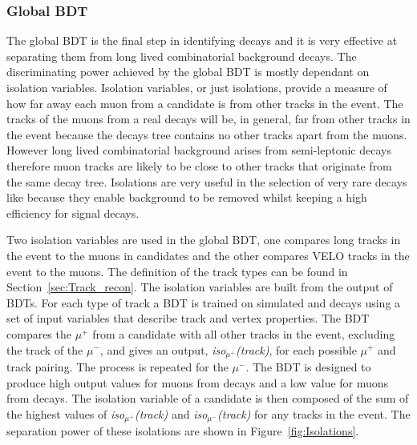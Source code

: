 \subsubsection{Global BDT}
\label{sec:globalBDT}

The global BDT is the final step in identifying \bmumu decays and it is very effective at separating them from long lived combinatorial background decays. The discriminating power achieved by the global BDT is mostly dependant on isolation variables. Isolation variables, or just isolations, provide a measure of how far away each muon from a \bmumu candidate is from other tracks in the event. The tracks of the muons from a real \bmumu decays will be, in general, far from other tracks in the event because the \bmumu decays tree contains no other tracks apart from the muons. However long lived combinatorial background arises from semi-leptonic decays therefore muon tracks are likely to be close to other tracks that originate from the same decay tree. %
Isolations are very useful in the selection of very rare decays like \bsmumu because they enable background to be removed whilst keeping a high efficiency for signal decays.

Two isolation variables are used in the global BDT, one compares long tracks in the event to the muons in \bmumu candidates and the other compares VELO tracks in the event to the muons. The definition of the track types can be found in Section~\ref{sec:Track_recon}. The isolation variables are built from the output of BDTs. For each type of track a BDT is trained on simulated \bsmumu and \bbbarmumux decays using a set of input variables that describe track and vertex properties. The BDT compares the $\mu^{+}$ from a \bsmumu candidate with all other tracks in the event, excluding the track of the $\mu^{-}$, and gives an output, {\it iso$_{\mu^{+}}$(track)}, for each possible $\mu^{+}$ and track pairing. The process is repeated for the $\mu^{-}$. The BDT is designed to produce high output values for muons from \bbbarmumux decays and a low value for muons from \bsmumu decays. The isolation variable of a \bsmumu candidate is then composed of the sum of the highest values of {\it iso$_{\mu^{+}}$(track)} and {\it iso$_{\mu^{-}}$(track)} for any tracks in the event. The separation power of these isolations are shown in Figure~\ref{fig:Isolations}. %

